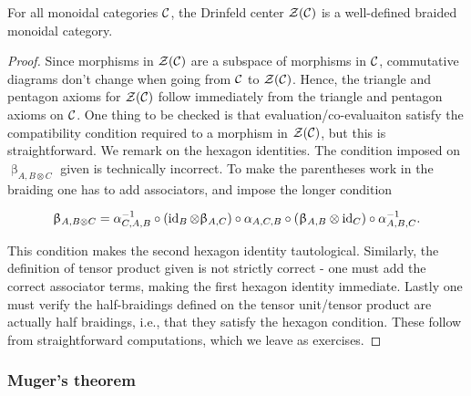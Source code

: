 \begin{prop} For all monoidal categories ${\mathcal C}$, the Drinfeld center ${\mathcal Z}({\mathcal C})$ is a well-defined braided monoidal category.
\end{prop}
\begin{proof} Since morphisms in ${\mathcal Z}({\mathcal C})$ are a subspace of morphisms in ${\mathcal C}$, commutative diagrams don't change when going from ${\mathcal C}$ to ${\mathcal Z}({\mathcal C})$. Hence, the triangle and pentagon axioms for ${\mathcal Z}({\mathcal C})$ follow immediately from the triangle and pentagon axioms on ${\mathcal C}$. One thing to be checked is that evaluation/co-evaluaiton satisfy the compatibility condition required to a morphism in ${\mathcal Z}({\mathcal C})$, but this is straightforward. We remark on the hexagon identities. The condition imposed on $\upbeta_{A,B\otimes C}$ given is technically incorrect. To make the parentheses work in the braiding one has to add associators, and impose the longer condition

$$\upbeta_{A,B\otimes C}=\alpha_{C,A,B}^{-1}\circ \left(\operatorname{id}_{B}\otimes \upbeta_{A,C}\right)\circ \alpha_{A,C,B}\circ\left(\upbeta_{A,B}\otimes \operatorname{id}_C\right)\circ \alpha^{-1}_{A,B,C}.$$

This condition makes the second hexagon identity tautological. Similarly, the definition of tensor product given is not strictly correct - one must add the correct associator terms, making the first hexagon identity immediate. Lastly one must verify the half-braidings defined on the tensor unit/tensor product are actually half braidings, i.e., that they satisfy the hexagon condition. These follow from straightforward computations, which we leave as exercises.
\end{proof}

\subsubsection{Muger's theorem}


